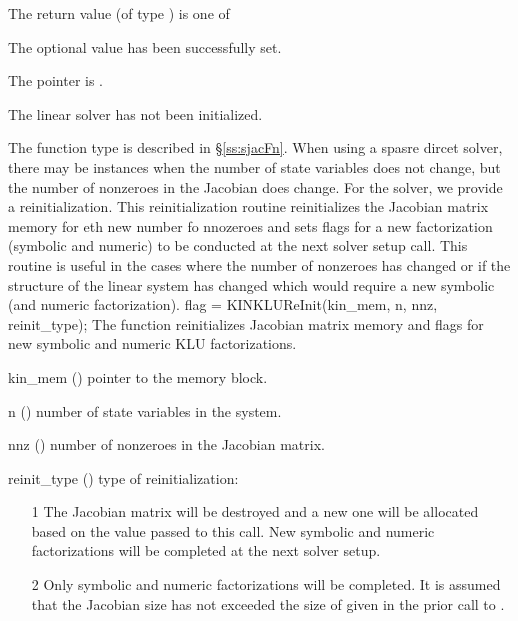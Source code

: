 {
  The return value  (of type ) is one of
  \begin{args}
  \item[\Id{KINSLS\_SUCCESS}] 
    The optional value has been successfully set.
  \item[\Id{KINSLS\_MEM\_NULL}]
    The  pointer is .
  \item[\Id{KINSLS\_LMEM\_NULL}]
    The {\kinsls} linear solver has not been initialized.
  \end{args}
}
{
  The function type  is described in \S\ref{ss:sjacFn}.
}
%
%
When using a spasre dircet solver, there 
may be instances when the number of state variables does not 
change, but the number of nonzeroes in the Jacobian does change.  
For the {\kinklu} solver, we provide a reinitialization.
This reinitialization routine reinitializes the Jacobian matrix
memory for eth new number fo nnozeroes and sets flags for a new factorization 
(symbolic and numeric) to be conducted at the next solver setup
call.  This routine is useful in the cases where the number of nonzeroes 
has changed or if the structure of the linear system has changed
which would require a new symbolic (and numeric factorization).
{
  flag = KINKLUReInit(kin\_mem, n, nnz, reinit\_type);
}
{
  The function  reinitializes Jacobian matrix memory and flags for
  new symbolic and numeric KLU factorizations.
}
{
  \begin{args}
  \item[kin\_mem] ()
    pointer to the {\kinsol} memory block.
  \item[n] ()
    number of state variables in the system.
  \item[nnz] ()
    number of nonzeroes in the Jacobian matrix.
  \item[reinit\_type] ()
    type of reinitialization:
    \begin{itemize}
    \item[1]  The Jacobian matrix will be destroyed and a new one will 
      be allocated based on the  value passed to this call. New symbolic and
      numeric factorizations will be completed at the next
      solver setup.
    \item[2]  Only symbolic and numeric factorizations will be completed.  
      It is assumed that the Jacobian size has not exceeded the size of 
       given in the prior call to {\kinklu}.
    \end{itemize}
  \end{args}
}

